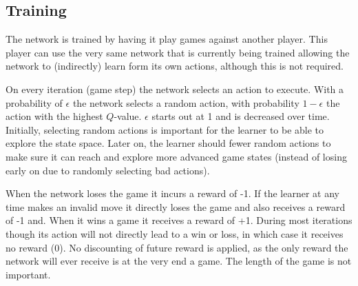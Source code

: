 \subsection{Training}
The network is trained by having it play games against another player. This player can use the very same network that is currently being trained allowing the network to (indirectly) learn form its own actions, although this is not required.

On every iteration (game step) the network selects an action to execute. With a probability of $\epsilon$ the network selects a random action, with probability $1 - \epsilon$ the action with the highest $Q$-value. $\epsilon$ starts out at 1 and is decreased over time. Initially, selecting random actions is important for the learner to be able to explore the state space. Later on, the learner should fewer random actions to make sure it can reach and explore more advanced game states (instead of losing early on due to randomly selecting bad actions).

When the network loses the game it incurs a reward of -1. If the learner at any time makes an invalid move it directly loses the game and also receives a reward of -1 and. When it wins a game it receives a reward of +1. During most iterations though its action will not directly lead to a win or loss, in which case it receives no reward (0). No discounting of future reward is applied, as the only reward the network will ever receive is at the very end a game. The length of the game is not important.